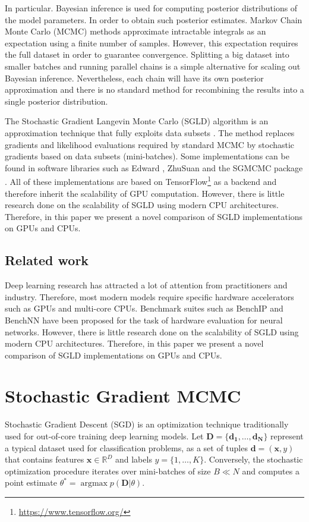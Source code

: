 \documentclass[conference]{IEEEtran}
\begin{document}
In particular. Bayesian inference is used for computing posterior distributions of the model parameters. In order to obtain such posterior estimates. Markov Chain Monte Carlo (MCMC) methods approximate intractable integrals as an expectation using a finite number of samples. However, this expectation requires the full dataset in order to guarantee convergence.  Splitting a big dataset into smaller batches and running parallel chains is a simple alternative for scaling out Bayesian inference. Nevertheless, each chain will have its own posterior approximation and there is no standard method for recombining the results into a single posterior distribution. 

The Stochastic Gradient Langevin Monte Carlo (SGLD) algorithm is an approximation technique that fully exploits data subsets \cite{welling2011bayesian}. The method replaces gradients and likelihood evaluations required by standard MCMC by stochastic gradients based on data subsets (mini-batches). Some implementations can be found in software libraries such as Edward \cite{Tran2018}, ZhuSuan \cite{zhusuan2017} and the SGMCMC package \cite{baker2017sgmcmc}. All of these implementations are based on TensorFlow\footnote{\url{https://www.tensorflow.org/}} as a backend and therefore inherit the scalability of GPU computation. However, there is little research done on the scalability of SGLD using modern CPU architectures. Therefore, in this paper we present a novel comparison of SGLD implementations on GPUs and CPUs. 
% 
\subsection{Related work}
Deep learning research has attracted a lot of attention from practitioners and industry. Therefore, most modern models require specific hardware accelerators such as GPUs and multi-core CPUs. Benchmark suites such as BenchIP \cite{Tao2018} and BenchNN \cite{Chen2012} have been proposed for the task of hardware evaluation for neural networks. However, there is little research done on the scalability of SGLD using modern CPU architectures. Therefore, in this paper we present a novel comparison of SGLD implementations on GPUs and CPUs. 

\section{Stochastic Gradient MCMC}
Stochastic Gradient Descent (SGD) is an optimization technique traditionally used for out-of-core training deep learning models. Let $\mathbf{D}=\{\mathbf{d_1},\ldots,\mathbf{d_N}\}$ represent a typical dataset used for classification problems, as a set of tuples $\mathbf{d}=(\mathbf x,y)$ that contains features $\mathbf x \in \mathbb R^D$ and labels $y=\{1,\ldots,K\}$. Conversely, the stochastic optimization procedure iterates  over mini-batches of size $B \ll N$ and computes a point estimate $\theta^\ast = \operatorname{argmax} p(\mathbf{D} \vert \theta)$.
\end{document}
